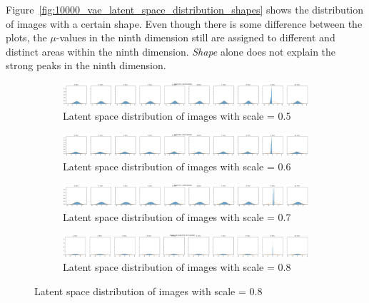 Figure~\ref{fig:10000_vae_latent_space_distribution_shapes} shows the distribution of images with a certain shape.
Even though there is some difference between the plots, the $\mu$-values in the ninth dimension still are assigned to different and distinct areas within the ninth dimension.
\textit{Shape} alone does not explain the strong peaks in the ninth dimension.

\begin{figure}
    \centering
    \begin{subfigure}{\textwidth}
        \centering
        \includegraphics[width=\textwidth]{images/latent_space_entanglement/vae_dsprites_lf_10000_dist_scale_0_5.png}
        \caption{Latent space distribution of images with scale = 0.5}
    \end{subfigure}
    \begin{subfigure}{\textwidth}
        \centering
        \includegraphics[width=\textwidth]{images/latent_space_entanglement/vae_dsprites_lf_10000_dist_scale_0_6.png}
        \caption{Latent space distribution of images with scale = 0.6}
    \end{subfigure}
    \begin{subfigure}{\textwidth}
        \centering
        \includegraphics[width=\textwidth]{images/latent_space_entanglement/vae_dsprites_lf_10000_dist_scale_0_7.png}
        \caption{Latent space distribution of images with scale = 0.7}
    \end{subfigure}
    \begin{subfigure}{\textwidth}
        \centering
        \includegraphics[width=\textwidth]{images/latent_space_entanglement/vae_dsprites_lf_10000_dist_scale_0_8.png}
        \caption{Latent space distribution of images with scale = 0.8}
    \end{subfigure}

\end{figure}
